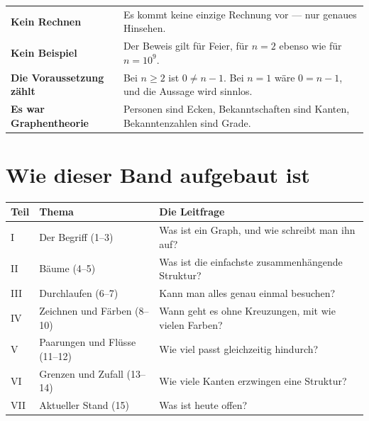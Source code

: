 \begin{merksatz}
\begin{center}
\renewcommand{\arraystretch}{1.5}
\begin{tabular}{@{}P{3.0cm}P{6.0cm}@{}}
\toprule
\textbf{Kein Rechnen} & Es kommt keine einzige Rechnung vor --- nur genaues Hinsehen.\\
\textbf{Kein Beispiel} & Der Beweis gilt für  Feier, für $n=2$ ebenso wie für $n = 10^{9}$.\\
\textbf{Die Voraussetzung zählt} & Bei $n \ge 2$ ist $0 \neq n-1$. Bei $n=1$ wäre $0 = n-1$, und die Aussage wird sinnlos.\\
\textbf{Es war Graphentheorie} & Personen sind Ecken, Bekanntschaften sind Kanten, Bekanntenzahlen sind Grade.\\
\bottomrule
\end{tabular}
\end{center}

\begin{center}
\begin{minipage}{0.88\textwidth}
\end{minipage}
\end{center}
\end{merksatz}

\section*{Wie dieser Band aufgebaut ist}

\begin{merksatz}
\begin{center}
{\small
\renewcommand{\arraystretch}{1.42}
\begin{tabular}{@{}P{1.0cm}P{3.4cm}P{4.4cm}@{}}
\toprule
\textbf{Teil} & \textbf{Thema} & \textbf{Die Leitfrage}\\
\midrule
I & Der Begriff (1--3) & Was ist ein Graph, und wie schreibt man ihn auf?\\
II & Bäume (4--5) & Was ist die einfachste zusammenhängende Struktur?\\
III & Durchlaufen (6--7) & Kann man alles genau einmal besuchen?\\
IV & Zeichnen und Färben (8--10) & Wann geht es ohne Kreuzungen, mit wie vielen Farben?\\
V & Paarungen und Flüsse (11--12) & Wie viel passt gleichzeitig hindurch?\\
VI & Grenzen und Zufall (13--14) & Wie viele Kanten erzwingen eine Struktur?\\
VII & Aktueller Stand (15) & Was ist heute offen?\\
\bottomrule
\end{tabular}}
\end{center}
\end{merksatz}

